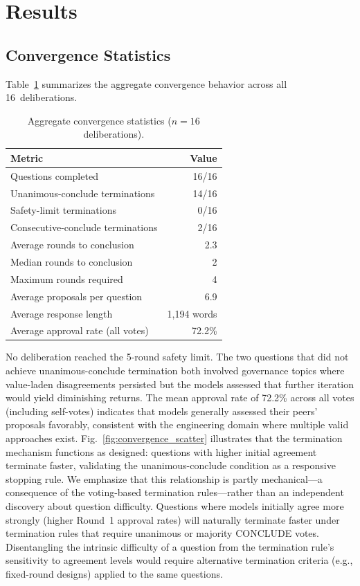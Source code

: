 \documentclass[11pt,a4paper]{article}
\begin{document}
\section{Results}
\label{sec:results}

\subsection{Convergence Statistics}

Table~\ref{tab:convergence} summarizes the aggregate convergence behavior across all 16~deliberations.

\begin{table}[ht]
\centering
\caption{Aggregate convergence statistics ($n = 16$ deliberations).}
\label{tab:convergence}
\begin{tabular}{@{}lr@{}}
\toprule
\textbf{Metric} & \textbf{Value} \\
\midrule
Questions completed & 16/16 \\
Unanimous-conclude terminations & 14/16 \\
Safety-limit terminations & 0/16 \\
Consecutive-conclude terminations & 2/16 \\
Average rounds to conclusion & 2.3 \\
Median rounds to conclusion & 2 \\
Maximum rounds required & 4 \\
Average proposals per question & 6.9 \\
Average response length & 1{,}194 words \\
Average approval rate (all votes) & 72.2\% \\
\bottomrule
\end{tabular}
\end{table}

No deliberation reached the 5-round safety limit. The two questions that did not achieve unanimous-conclude termination both involved governance topics where value-laden disagreements persisted but the models assessed that further iteration would yield diminishing returns. The mean approval rate of 72.2\% across all votes (including self-votes) indicates that models generally assessed their peers' proposals favorably, consistent with the engineering domain where multiple valid approaches exist. Fig.~\ref{fig:convergence_scatter} illustrates that the termination mechanism functions as designed: questions with higher initial agreement terminate faster, validating the unanimous-conclude condition as a responsive stopping rule. We emphasize that this relationship is partly mechanical---a consequence of the voting-based termination rules---rather than an independent discovery about question difficulty. Questions where models initially agree more strongly (higher Round~1 approval rates) will naturally terminate faster under termination rules that require unanimous or majority CONCLUDE votes. Disentangling the intrinsic difficulty of a question from the termination rule's sensitivity to agreement levels would require alternative termination criteria (e.g., fixed-round designs) applied to the same questions.
\end{document}
